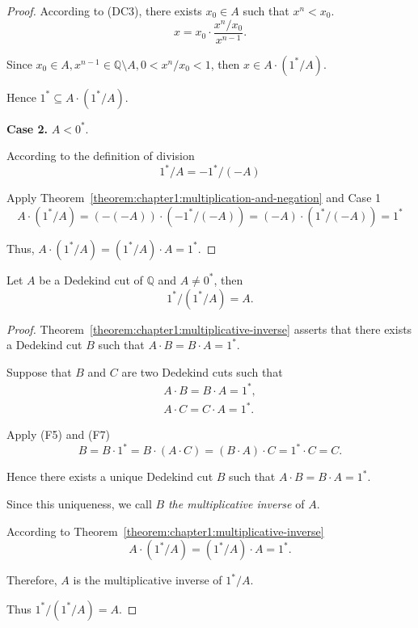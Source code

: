 \begin{proof}
    According to (DC3), there exists $x_{0}\in A$ such that $x^{n} < x_{0}$.
    \[
        x = x_{0}\cdot\frac{x^{n}/x_{0}}{x^{n-1}}.
    \]

    Since $x_{0}\in A, x^{n-1}\in\mathbb{Q}\setminus A, 0 < x^{n}/x_{0} < 1$, then $x\in A\cdot ({1}^{*}/A)$.

    Hence ${1}^{*}\subseteq A\cdot ({1}^{*}/A)$.

    \bigskip
    \textbf{Case 2.} $A < {0}^{*}$.

    According to the definition of division
    \[
        {1}^{*}/A = -{1}^{*}/(-A)
    \]

    Apply Theorem~\ref{theorem:chapter1:multiplication-and-negation} and Case 1
    \[
        A\cdot ({1}^{*}/A) = (-(-A))\cdot (-{1}^{*}/(-A)) = (-A)\cdot ({1}^{*}/(-A)) = {1}^{*}
    \]

    Thus, $A\cdot ({1}^{*}/A) = ({1}^{*}/A)\cdot A = {1}^{*}$.
\end{proof}

\begin{theorem}
    Let $A$ be a Dedekind cut of $\mathbb{Q}$ and $A\ne {0}^{*}$, then
    \[
        {1}^{*}/({1}^{*}/A) = A.
    \]
\end{theorem}

\begin{proof}
    Theorem~\ref{theorem:chapter1:multiplicative-inverse} asserts that there exists a Dedekind cut $B$ such that $A\cdot B = B\cdot A = {1}^{*}$.

    Suppose that $B$ and $C$ are two Dedekind cuts such that
    \[
        \begin{split}
            A\cdot B = B\cdot A = {1}^{*}, \\
            A\cdot C = C\cdot A = {1}^{*}.
        \end{split}
    \]

    Apply (F5) and (F7)
    \[
        B = B\cdot {1}^{*} = B\cdot (A\cdot C) = (B\cdot A)\cdot C = {1}^{*}\cdot C = C.
    \]

    Hence there exists a unique Dedekind cut $B$ such that $A\cdot B = B\cdot A = {1}^{*}$.

    Since this uniqueness, we call $B$ \textit{the multiplicative inverse} of $A$.

    According to Theorem~\ref{theorem:chapter1:multiplicative-inverse}
    \[
        A\cdot ({1}^{*}/A) = ({1}^{*}/A)\cdot A = {1}^{*}.
    \]

    Therefore, $A$ is the multiplicative inverse of ${1}^{*}/A$.

    Thus ${1}^{*}/({1}^{*}/A) = A$.
\end{proof}

